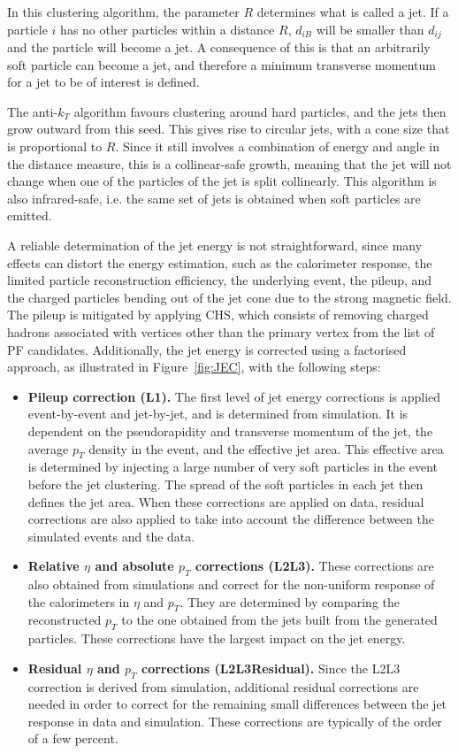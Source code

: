 In this clustering algorithm, the parameter $R$ determines what is called a jet. If a particle $i$ has no other particles within a distance $R$, $d_{iB}$ will be smaller than $d_{ij}$ and the particle will become a jet. A consequence of this is that an arbitrarily soft particle can become a jet, and therefore a minimum transverse momentum for a jet to be of interest is defined.

The anti-$k_T$ algorithm favours clustering around hard particles, and the jets then grow outward from this seed. This gives rise to circular jets, with a cone size that is proportional to $R$. Since it still involves a combination of energy and angle in the distance measure, this is a collinear-safe growth, meaning that the jet will not change when one of the particles of the jet is split collinearly. This algorithm is also infrared-safe, i.e. the same set of jets is obtained when soft particles are emitted.

A reliable determination of the jet energy is not straightforward, since many effects can distort the energy estimation, such as the calorimeter response, the limited particle reconstruction efficiency, the underlying event, the pileup, and the charged particles bending out of the jet cone due to the strong magnetic field. The pileup is mitigated by applying \ac{CHS}, which consists of removing charged hadrons associated with vertices other than the primary vertex from the list of \ac{PF} candidates. Additionally, the jet energy is corrected using a factorised approach, as illustrated in Figure~\ref{fig:JEC}, with the following steps:
\begin{itemize}
 \item \textbf{Pileup correction (L1).} The first level of jet energy corrections is applied event-by-event and jet-by-jet, and is determined from simulation. It is dependent on the pseudorapidity and transverse momentum of the jet, the average $p_T$ density in the event, and the effective jet area. This effective area is determined by injecting a large number of very soft particles in the event before the jet clustering. The spread of the soft particles in each jet then defines the jet area. When these corrections are applied on data, residual corrections are also applied to take into account the difference between the simulated events and the data.
 
 \item \textbf{Relative $\eta$ and absolute $p_T$ corrections (L2L3).} These corrections are also obtained from simulations and correct for the non-uniform response of the calorimeters in $\eta$ and $p_T$. They are determined by comparing the reconstructed $p_T$ to the one obtained from the jets built from the generated particles. These corrections have the largest impact on the jet energy.
 
 \item \textbf{Residual $\eta$ and $p_T$ corrections (L2L3Residual).} Since the L2L3 correction is derived from simulation, additional residual corrections are needed in order to correct for the remaining small differences between the jet response in data and simulation. These corrections are typically of the order of a few percent.
\end{itemize}

